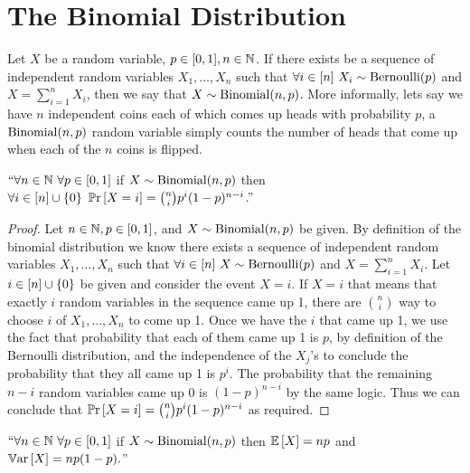     \section{The Binomial Distribution}
        \begin{definition}
            Let $X$ be a random variable, $p \in [0, 1], n \in \mathbb{N}$. If there exists 
            be a sequence of independent random variables $X_1, \dots, X_n$ such that $\forall i \in [n] \ \dist{X_i}{\bern{p}}$
            and $X = \sum_{i = 1}^{n} X_i$, then we say that $X \sim \mathrm{Binomial}(n, p)$. More informally,
            lets say we have $n$ independent coins each of which comes up heads with probability $p$,
            a $\mathrm{Binomial}(n, p)$ random variable simply counts the number of heads that come up when each 
            of the $n$ coins is flipped.
        \end{definition}
        \begin{theorem}
            $``\forall n \in \mathbb{N} \ \forall p \in [0, 1]$ if $X \sim \mathrm{Binomial}(n, p)$ then \\
            $\forall i \in [n] \cup \left\{0\right\} \ \mathbb{P}\mathrm{r} \left[X = i\right] = \binom{n}{i}p^i(1 - p)^{n - i}$.''
        \end{theorem}
        \begin{proof}
            Let $n \in \mathbb{N}, p \in [0, 1]$, and $X \sim \mathrm{Binomial}(n, p)$ be given. By definition
            of the binomial distribution we know there exists a sequence of independent random variables
            $X_1, \dots, X_n$ such that $\forall i \in [n] \ \dist{X}{\bern{p}}$ and
            $X = \sum_{i = 1}^{n} X_i$. Let $i \in [n] \cup \left\{0\right\}$ be given and consider
            the event $X = i$. If $X = i$ that means that exactly $i$ random variables in the
            sequence came up 1, there are $\binom{n}{i}$ way to choose $i$ of $X_1, \dots, X_n$
            to come up 1. Once we have the $i$ that came up 1, we use the fact that probability that
            each of them came up 1 is $p$, by definition of the Bernoulli distribution, and the 
            independence of the $X_j$'s to conclude 
            the probability that they all came up 1 is $p^{i}$.
            The probability that the remaining $n - i$ random variables came up 0 is $(1 - p)^{n - i}$
            by the same logic. Thus we can conclude that $\mathbb{P}\mathrm{r} \left[X = i\right] = \binom{n}{i}p^i(1 - p)^{n - i}$
            as required. \QED
        \end{proof}
        \begin{theorem}
            $``\forall n \in \mathbb{N} \ \forall p \in [0, 1]$ if $X \sim \mathrm{Binomial}(n, p)$ then
            $\mathbb{E}\left[X\right] = np$ and $\mathbb{V}\mathrm{ar}\left[X\right] = np(1 - p).$''
            \label{bin}
        \end{theorem}
